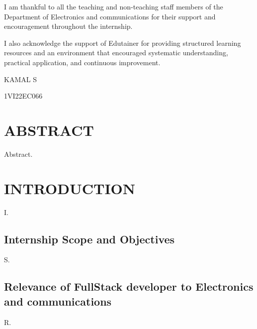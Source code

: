 \documentclass[12pt,a4paper]{report}
\begin{document}
I am thankful to all the teaching and non-teaching staff members of the Department of Electronics and communications for their support and encouragement throughout the internship.

I also acknowledge the support of Edutainer for providing structured learning resources and an environment that encouraged systematic understanding, practical application, and continuous improvement.

\vspace{0.5cm}
KAMAL S\par
1VI22EC066\par

\newpage
\chapter*{ABSTRACT}


Abstract.


\newpage
\tableofcontents
{}

\newpage
\listoffigures
{}

\chapter{INTRODUCTION}


I.


\section{Internship Scope and Objectives}

S.


\section{Relevance of FullStack developer to Electronics and communications}

R.
\end{document}
